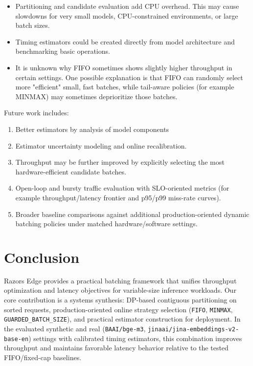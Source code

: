 \documentclass{article}
\providecommand{\tightlist}{\setlength{\itemsep}{0pt}\setlength{\parskip}{0pt}}
\begin{document}
\begin{itemize}
\tightlist
\item
  Partitioning and candidate evaluation add CPU overhead. This may cause
  slowdowns for very small models, CPU-constrained environments, or
  large batch sizes.
\item
  Timing estimators could be created directly from model architecture
  and benchmarking basic operations.
\item
  It is unknown why FIFO sometimes shows slightly higher throughput in
  certain settings. One possible explanation is that FIFO can randomly
  select more "efficient" small, fast batches, while tail-aware policies
  (for example MINMAX) may sometimes deprioritize those batches.
\end{itemize}

Future work includes:

\begin{enumerate}
\def\labelenumi{\arabic{enumi}.}
\tightlist
\item
  Better estimators by analysis of model components
\item
  Estimator uncertainty modeling and online recalibration.
\item
  Throughput may be further improved by explicitly selecting the most
  hardware-efficient candidate batches.
\item
  Open-loop and bursty traffic evaluation with SLO-oriented metrics (for
  example throughput/latency frontier and p95/p99 miss-rate curves).
\item
  Broader baseline comparisons against additional production-oriented
  dynamic batching policies under matched hardware/software settings.
\end{enumerate}

\hypertarget{9-conclusion}{%
\section{Conclusion}\label{9-conclusion}}

Razor\textquotesingle s Edge provides a practical batching framework
that unifies throughput optimization and latency objectives for
variable-size inference workloads. Our core contribution is a systems
synthesis: DP-based contiguous partitioning on sorted requests,
production-oriented online strategy selection (\texttt{FIFO},
\texttt{MINMAX}, \texttt{GUARDED\_BATCH\_SIZE}), and practical estimator
construction for deployment. In the evaluated synthetic and real
(\texttt{BAAI/bge-m3}, \texttt{jinaai/jina-embeddings-v2-base-en})
settings with calibrated timing estimators, this combination improves
throughput and maintains favorable latency behavior relative to the
tested FIFO/fixed-cap baselines.
\end{document}
